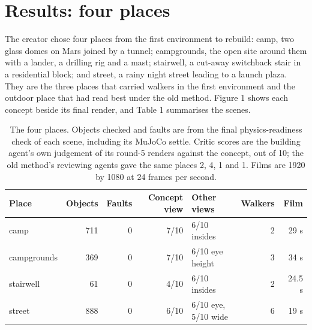 \section{Results: four places}\label{results-four-places}

The creator chose four places from the first environment to rebuild: camp, two glass domes on Mars joined by a tunnel; campgrounds, the open site around them with a lander, a drilling rig and a mast; stairwell, a cut-away switchback stair in a residential block; and street, a rainy night street leading to a launch plaza. They are the three places that carried walkers in the first environment and the outdoor place that had read best under the old method. Figure 1 shows each concept beside its final render, and Table 1 summarises the scenes.

\begin{table}[tbp]
\centering\small
\caption{The four places. Objects checked and faults are from the final physics-readiness check of each scene, including its MuJoCo settle. Critic scores are the building agent's own judgement of its round-5 renders against the concept, out of 10; the old method's reviewing agents gave the same places 2, 4, 1 and 1. Films are 1920 by 1080 at 24 frames per second.}
\begin{tabular}{@{}lrrrlrr@{}}
\hline
Place & Objects & Faults & Concept view & Other views & Walkers & Film \\
\hline
camp & 711 & 0 & 7/10 & 6/10 insides & 2 & 29 s \\
campgrounds & 369 & 0 & 7/10 & 6/10 eye height & 3 & 34 s \\
stairwell & 61 & 0 & 4/10 & 6/10 insides & 2 & 24.5 s \\
street & 888 & 0 & 6/10 & 6/10 eye, 5/10 wide & 6 & 19 s \\
\hline
\end{tabular}
\end{table}

